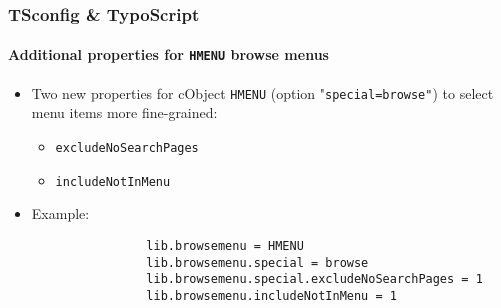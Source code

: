 
\begin{frame}[fragile]
	\frametitle{TSconfig \& TypoScript}
	\framesubtitle{Additional properties for \texttt{HMENU} browse menus}

	\begin{itemize}
		\item Two new properties for cObject \texttt{HMENU} (option "\texttt{special=browse"})\newline
			to select menu items more fine-grained:

			\begin{itemize}
				\item \texttt{excludeNoSearchPages}
				\item \texttt{includeNotInMenu}
			\end{itemize}

		\item Example:

			\begin{lstlisting}
				lib.browsemenu = HMENU
				lib.browsemenu.special = browse
				lib.browsemenu.special.excludeNoSearchPages = 1
				lib.browsemenu.includeNotInMenu = 1
			\end{lstlisting}

	\end{itemize}

\end{frame}


